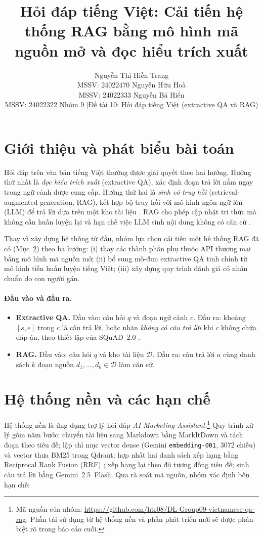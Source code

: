 \documentclass[11pt]{article}
\title{Hỏi đáp tiếng Việt: Cải tiến hệ thống RAG bằng mô hình mã nguồn mở và đọc hiểu trích xuất}
\author{Nguyễn Thị Hiền Trang \\
  MSSV: 24022470 \And
  Nguyễn Hữu Hoà \\
  MSSV: 24022333 \And
  Nguyễn Bá Hiển \\
  MSSV: 24022322 \AND
  Nhóm 9 \quad|\quad Đề tài 10: Hỏi đáp tiếng Việt (extractive QA và RAG)}
\begin{document}
\maketitle

\section{Giới thiệu và phát biểu bài toán}

Hỏi đáp trên văn bản tiếng Việt thường được giải quyết theo hai hướng. Hướng thứ nhất là \emph{đọc hiểu trích xuất} (extractive QA), xác định đoạn trả lời nằm ngay trong ngữ cảnh được cung cấp. Hướng thứ hai là \emph{sinh có truy hồi} (retrieval-augmented generation, RAG), kết hợp bộ truy hồi với mô hình ngôn ngữ lớn (LLM) để trả lời dựa trên một kho tài liệu \citep{lewis2020rag}. RAG cho phép cập nhật tri thức mà không cần huấn luyện lại và hạn chế việc LLM sinh nội dung không có căn cứ \citep{ji2023hallucination}.

Thay vì xây dựng hệ thống từ đầu, nhóm lựa chọn cải tiến một hệ thống RAG đã có (Mục~\ref{sec:base}) theo ba hướng: (i) thay các thành phần phụ thuộc API thương mại bằng mô hình mã nguồn mở; (ii) bổ sung mô-đun extractive QA tinh chỉnh từ mô hình tiền huấn luyện tiếng Việt; (iii) xây dựng quy trình đánh giá có nhãn chuẩn do con người gán.

\paragraph{Đầu vào và đầu ra.}
\begin{itemize}
  \item \textbf{Extractive QA.} Đầu vào: câu hỏi $q$ và đoạn ngữ cảnh $c$. Đầu ra: khoảng $[s,e]$ trong $c$ là câu trả lời, hoặc nhãn \emph{không có câu trả lời} khi $c$ không chứa đáp án, theo thiết lập của SQuAD~2.0 \citep{rajpurkar-etal-2018-know}.
  \item \textbf{RAG.} Đầu vào: câu hỏi $q$ và kho tài liệu $\mathcal{D}$. Đầu ra: câu trả lời $a$ cùng danh sách $k$ đoạn nguồn $d_1,\dots,d_k \in \mathcal{D}$ làm căn cứ.
\end{itemize}

\section{Hệ thống nền và các hạn chế}
\label{sec:base}

Hệ thống nền là ứng dụng trợ lý hỏi đáp \emph{AI Marketing Assistant}.\footnote{Mã nguồn của nhóm: \url{https://github.com/htr08/DL-Group09-vietnamese-qa-rag}. Phần tái sử dụng từ hệ thống nền và phần phát triển mới sẽ được phân biệt rõ trong báo cáo cuối.} Quy trình xử lý gồm năm bước: chuyển tài liệu sang Markdown bằng MarkItDown và tách đoạn theo tiêu đề; lập chỉ mục vector dense (Gemini \texttt{embedding-001}, 3072 chiều) và vector thưa BM25 \citep{robertson2009bm25} trong Qdrant; hợp nhất hai danh sách xếp hạng bằng Reciprocal Rank Fusion (RRF) \citep{cormack2009rrf}; xếp hạng lại theo độ tương đồng tiêu đề; sinh câu trả lời bằng Gemini~2.5~Flash. Qua rà soát mã nguồn, nhóm xác định bốn hạn chế:
\end{document}
